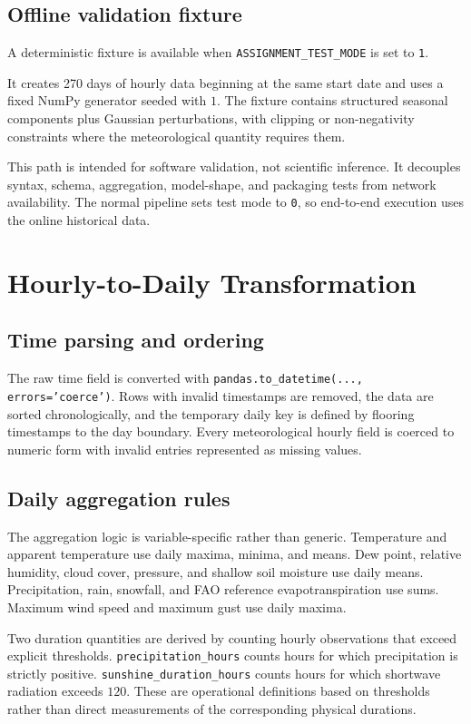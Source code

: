 \documentclass[11pt,a4paper]{article}
\newcommand{\code}[1]{\texttt{#1}}
\begin{document}
\subsection{Offline validation fixture}
A deterministic fixture is available when \code{ASSIGNMENT\_TEST\_MODE} is set to \code{1}.

It creates 270 days of hourly data beginning at the same start date and uses a fixed NumPy generator seeded with $1$. The fixture contains structured seasonal components plus Gaussian perturbations, with clipping or non-negativity constraints where the meteorological quantity requires them.

This path is intended for software validation, not scientific inference. It decouples syntax, schema, aggregation, model-shape, and packaging tests from network availability. The normal pipeline sets test mode to \code{0}, so end-to-end execution uses the online historical data.

\section{Hourly-to-Daily Transformation}
\subsection{Time parsing and ordering}
The raw time field is converted with \code{pandas.to\_datetime(..., errors='coerce')}. Rows with invalid timestamps are removed, the data are sorted chronologically, and the temporary daily key is defined by flooring timestamps to the day boundary. Every meteorological hourly field is coerced to numeric form with invalid entries represented as missing values.

\subsection{Daily aggregation rules}
The aggregation logic is variable-specific rather than generic. Temperature and apparent temperature use daily maxima, minima, and means. Dew point, relative humidity, cloud cover, pressure, and shallow soil moisture use daily means. Precipitation, rain, snowfall, and FAO reference evapotranspiration use sums. Maximum wind speed and maximum gust use daily maxima.

Two duration quantities are derived by counting hourly observations that exceed explicit thresholds. \code{precipitation\_hours} counts hours for which precipitation is strictly positive. \code{sunshine\_duration\_hours} counts hours for which shortwave radiation exceeds $120$. These are operational definitions based on thresholds rather than direct measurements of the corresponding physical durations.
\end{document}
